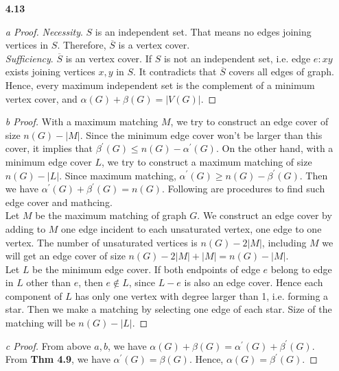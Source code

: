 \documentclass[12pt]{article}
\begin{document}
\begin{enumerate}
\begin{proof}[Proof of Birkhoff Theorem]
Therefore, we have
\begin{equation*}
Q = M_0 = \alpha_0 P_1 + (1-\alpha_0)\alpha_1 P_1 + \dots +(1- \alpha_0)\alpha_n P_n
\end{equation*}
Let $\alpha_0 = c_1, (1-\alpha_0)\alpha_1 = c_2, \dots $, where  $$\sum_i^m c_i = \alpha_0 + (1-\alpha_0)(\alpha_1 + \alpha_2 + \dots + \alpha_{m-1}) = \alpha_0 + (1-\alpha_0) = 1$$
\end{proof}
\item[\textbf{4.13}] 
\begin{proof}[a Proof]
\textit{Necessity}. $S$ is an independent set. That means no edges joining vertices in $S$. Therefore, $\overline{S}$ is a vertex cover.\\
\textit{Sufficiency}. $\overline{S}$ is an vertex cover. If $S$ is not an independent set, i.e. edge ${e: xy}$ exists joining vertices $x,y$ in $S$. It contradicts that $\overline{S}$ covers all edges of graph.   \\
Hence, every maximum independent set is the complement of a minimum vertex cover, and $\alpha(G) + \beta(G) = |V(G)|$.
\end{proof}
\begin{proof}[b Proof]
With a maximum matching $M$, we try to construct an edge cover of size $n(G)- |M|$. Since the minimum edge cover won't be larger than this cover, it implies that $\beta^\prime(G) \leq n(G) - \alpha^\prime(G)$.
On the other hand, with a minimum edge cover $L$, we try to construct a maximum matching of size $n(G)-|L|$. Since maximum matching, $\alpha^\prime(G) \geq n(G) - \beta^\prime(G)$. Then we have $\alpha^\prime(G) + \beta^\prime(G) = n(G)$. Following are procedures to find such edge cover and mathcing.\\
Let $M$ be the maximum matching of graph $G$. We construct an edge cover by adding to $M$ one edge incident to each unsaturated vertex, one edge to one vertex. The number of unsaturated vertices is $n(G) - 2|M|$, including $M$ we will get an edge cover of size $n(G)-2|M| + |M| = n(G)-|M|$.\\
Let $L$ be the minimum edge cover. If both endpoints of edge $e$ belong to edge in $L$ other than $e$, then $e \not\in L$, since $L-{e}$ is also an edge cover. 
Hence each component of $L$ has only one vertex with degree larger than 1, i.e. forming a star. Then we make a matching by selecting one edge of each star. Size of the matching will be $n(G)- |L|$.
\end{proof}
\begin{proof}[c Proof]
From above $a,b$, we have $\alpha(G)+\beta(G)=\alpha^\prime(G)+ \beta^\prime(G)$. From \textbf{Thm 4.9}, we have $\alpha^\prime(G) = \beta(G)$. Hence, $\alpha(G) = \beta^\prime(G)$.
\end{proof}
\end{enumerate}



\end{document}
